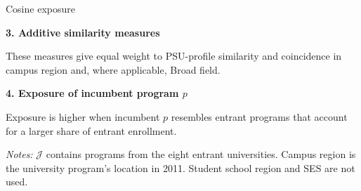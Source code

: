 \documentclass{beamer}
\begin{document}
\begin{frame}{Cosine exposure}
\vspace{0.05cm}

\textbf{3. Additive similarity measures}

\begin{center}
\end{center}

\vspace{-0.10cm}

These measures give equal weight to PSU-profile similarity and coincidence
in campus region and, where applicable, Broad field.

\vspace{0.05cm}

\textbf{4. Exposure of incumbent program \(p\)}

\begin{center}
\end{center}

\vspace{-0.10cm}

Exposure is higher when incumbent \(p\) resembles entrant programs that
account for a larger share of entrant enrollment.

\vspace{0.03cm}

\tiny
\textit{Notes:}
\(\mathcal J\) contains programs from the eight entrant universities.
Campus region is the university program's location in 2011. Student school
region and SES are not used.

\end{frame}
   
\end{document}
